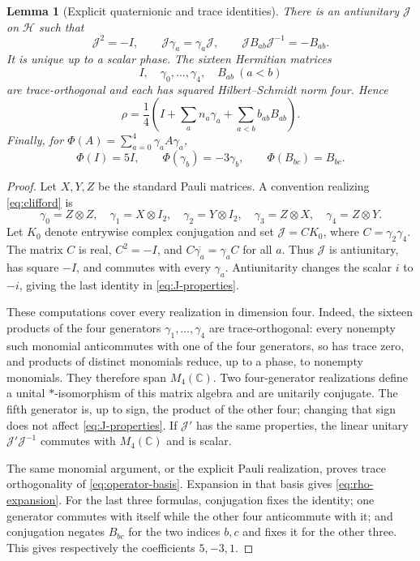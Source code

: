 \documentclass[11pt]{article}
\newtheorem{lemma}[lemma]{Lemma}
\theoremstyle{definition}
\theoremstyle{remark}
\newcommand{\C}{\mathbb C}
\newcommand{\HH}{\mathcal H}
\newcommand{\Jq}{\mathcal J}
\begin{document}
\begin{lemma}[Explicit quaternionic and trace identities]
\label{lem:quaternionic}
There is an antiunitary $\Jq$ on $\HH$ such that
\begin{equation}
 \Jq^2=-I,\qquad \Jq\gamma_a=\gamma_a\Jq,
 \qquad \Jq B_{ab}\Jq^{-1}=-B_{ab}.
 \label{eq:J-properties}
\end{equation}
It is unique up to a scalar phase. The sixteen Hermitian matrices
\begin{equation}
 I,\quad \gamma_0,\ldots,\gamma_4,\quad B_{ab}\ (a<b)
 \label{eq:operator-basis}
\end{equation}
are trace-orthogonal and each has squared Hilbert--Schmidt norm four. Hence
\begin{equation}
 \rho=\frac14\left(I+\sum_a n_a\gamma_a
                     +\sum_{a<b}b_{ab}B_{ab}\right).
 \label{eq:rho-expansion}
\end{equation}
Finally, for $\Phi(A)=\sum_{a=0}^4\gamma_aA\gamma_a$,
\begin{equation}
 \Phi(I)=5I,\qquad \Phi(\gamma_b)=-3\gamma_b,
 \qquad \Phi(B_{bc})=B_{bc}.
 \label{eq:Phi}
\end{equation}
\end{lemma}
\begin{proof}
Let $X,Y,Z$ be the standard Pauli matrices. A convention realizing
\eqref{eq:clifford} is
\begin{equation}
 \gamma_0=Z\otimes Z,\quad
 \gamma_1=X\otimes I_2,\quad
 \gamma_2=Y\otimes I_2,\quad
 \gamma_3=Z\otimes X,\quad
 \gamma_4=Z\otimes Y.
 \label{eq:pauli-realization}
\end{equation}
Let $K_0$ denote entrywise complex conjugation and set
$\Jq=C K_0$, where $C=\gamma_2\gamma_4$. The matrix $C$ is real,
$C^2=-I$, and $C\overline{\gamma_a}=\gamma_a C$ for all $a$.
Thus $\Jq$ is antiunitary, has square $-I$, and commutes with every
$\gamma_a$. Antiunitarity changes the scalar $i$ to $-i$, giving the last
identity in \eqref{eq:J-properties}.

These computations cover every realization in dimension four. Indeed, the
sixteen products of the four generators $\gamma_1,\ldots,\gamma_4$ are
trace-orthogonal: every nonempty such monomial anticommutes with one of the
four generators, so has trace zero, and products of distinct monomials
reduce, up to a phase, to nonempty monomials. They therefore span $M_4(\C)$.
Two four-generator realizations define a unital $*$-isomorphism of this
matrix algebra and are unitarily conjugate. The fifth generator is, up to
sign, the product of the other four; changing that sign does not affect
\eqref{eq:J-properties}. If $\Jq'$ has the same properties, the linear unitary
$\Jq'\Jq^{-1}$ commutes with $M_4(\C)$ and is scalar.

The same monomial argument, or the explicit Pauli realization, proves trace
orthogonality of \eqref{eq:operator-basis}. Expansion in that basis gives
\eqref{eq:rho-expansion}. For the last three formulas, conjugation fixes the
identity; one generator commutes with itself while the other four
anticommute with it; and conjugation negates $B_{bc}$ for the two indices
$b,c$ and fixes it for the other three. This gives respectively the
coefficients $5,-3,1$.
\end{proof}
\end{document}
